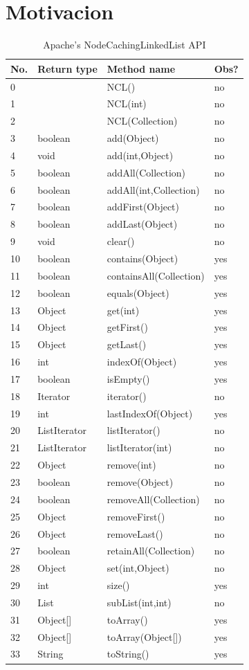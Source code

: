 \section{Motivacion}
\label{sec:motivacion}
\begin{table}[H]
\center
{\scriptsize
\begin{tabular}{|l|l|l|l|}
\hline
No. &Return type & Method name & Obs? \\
\hline
    0 && NCL() & no \\
    1& & NCL(int) & no \\
    2&& NCL(Collection) & no \\
    3&boolean & add(Object) & no \\
    4&void&add(int,Object) & no \\
    5&boolean&addAll(Collection) & no\\
    6&boolean&addAll(int,Collection) & no \\
    7&boolean&addFirst(Object) & no \\
    8&boolean&addLast(Object) & no\\
    9&void&clear() & no\\
    10&boolean&contains(Object) & yes \\
    11&boolean&containsAll(Collection) & yes \\
    12&boolean&equals(Object) & yes \\
    13&Object&get(int) & yes\\
    14&Object&getFirst() &yes \\
    15&Object&getLast() & yes\\
    16&int&indexOf(Object) &yes\\
    17&boolean&isEmpty() & yes\\
    18&Iterator&iterator() & no\\
    19&int&lastIndexOf(Object) &yes \\
    20&ListIterator&listIterator() &no \\
    21&ListIterator&listIterator(int) & no\\
    22&Object&remove(int) &no\\
    23&boolean&remove(Object) & no \\
    24&boolean&removeAll(Collection) & no \\
    25&Object&removeFirst() &no\\
    26&Object&removeLast() &no\\
    27&boolean&retainAll(Collection) &no \\
    28&Object&set(int,Object) &no\\
    29&int&size() &yes\\
    30&List&subList(int,int) & no \\
    31&Object[]&toArray() & yes \\
    32&Object[]&toArray(Object[]) &yes\\
    33&String&toString() & yes \\
\hline
\end{tabular}
}
\caption{Apache's NodeCachingLinkedList API}
\label{tab:ncl-api}
\end{table} 

